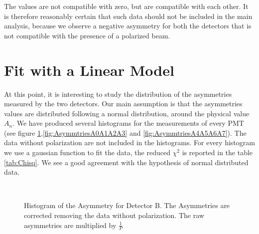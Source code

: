 The values are not compatible with zero, but are compatible with each other. It is therefore reasonably certain that such data should not be included in the main analysis, because we observe a negative asymmetry for both the detectors that is not compatible with the presence of a polarized beam.

\section{Fit with a Linear Model}

At this point, it is interesting to study the distribution of the asymmetries measured by the two detectors. Our main assumption is that the asymmetries values are distributed following a normal distribution, around the physical value $A_{n}$. We have produced several histograms for the measurements of every PMT (see figure \ref{fig:AsymmtriesB0B1B2},\ref{fig:AsymmtriesA0A1A2A3} and \ref{fig:AsymmtriesA4A5A6A7}). The data without polarization are not included in the histograms. For every histogram we use a gaussian function to fit the data, the reduced $\chi^{2}$ is reported in the table \ref{tab:Chisq}.
We see a good agreement with the hypothesis of normal distributed data.

\begin{figure}[!ht]
\centering
{}
\\
\caption{Histogram of the Asymmetry for Detector B. The Asymmetries are corrected removing the data without polarization. The raw asymmetries are multiplied by $\frac{1}{P}$}
\label{fig:AsymmtriesB0B1B2}
\end{figure}


